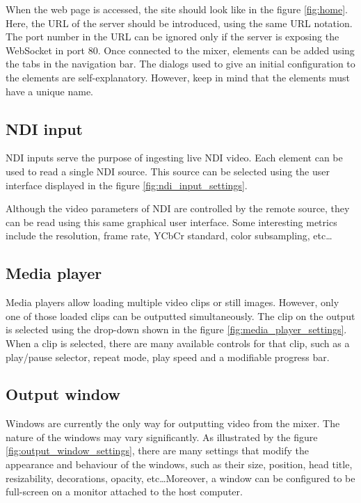 \documentclass[../main.tex]{subfiles}
\begin{document}
When the web page is accessed, the site should look like in the figure \ref{fig:home}. Here, the URL of the server should be introduced, using the same URL notation. The port number in the URL can be ignored only if the server is exposing the WebSocket in port 80. Once connected to the mixer, elements can be added using the tabs in the navigation bar. The dialogs used to give an initial configuration to the elements are self-explanatory. However, keep in mind that the elements must have a unique name.\newline


\subsection{NDI input}

NDI inputs serve the purpose of ingesting live NDI video. Each element can be used to read a single NDI source. This source can be selected using the user interface displayed in the figure \ref{fig:ndi_input_settings}.\newline

Although the video parameters of NDI are controlled by the remote source, they can be read using this same graphical user interface. Some interesting metrics include the resolution, frame rate, YCbCr standard, color subsampling, etc\dots



\subsection{Media player}

Media players allow loading multiple video clips or still images. However, only one of those loaded clips can be outputted simultaneously. The clip on the output is selected using the drop-down shown in the figure \ref{fig:media_player_settings}. When a clip is selected, there are many available controls for that clip, such as a play/pause selector, repeat mode, play speed and a modifiable progress bar.



\subsection{Output window}

Windows are currently the only way for outputting video from the mixer. The nature of the windows may vary significantly. As illustrated by the figure \ref{fig:output_window_settings}, there are many settings that modify the appearance and behaviour of the windows, such as their size, position, head title, resizability, decorations, opacity, etc\dots Moreover, a window can be configured to be full-screen on a monitor attached to the host computer.\newline
\end{document}
